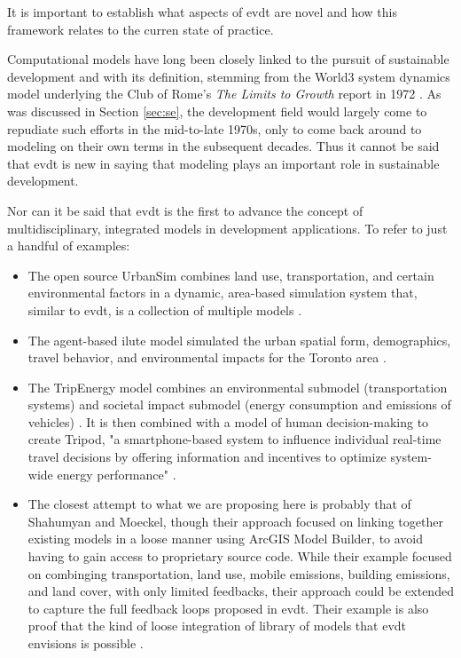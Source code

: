 \documentclass[notitlepage]{article}
\begin{document}
It is important to establish what aspects of \ac{evdt} are novel and how this framework relates to the curren state of practice. 

Computational models have long been closely linked to the pursuit of sustainable development and with its definition, stemming from the World3 system dynamics model underlying the Club of Rome's \textit{The Limits to Growth} report in 1972 \cite{meadowsLimitsGrowth1972}. As was discussed in Section \ref{sec:se}, the development field would largely come to repudiate such efforts in the mid-to-late 1970s, only to come back around to modeling on their own terms in the subsequent decades. Thus it cannot be said that \ac{evdt} is new in saying that modeling plays an important role in sustainable development. 

Nor can it be said that \ac{evdt} is the first to advance the concept of multidisciplinary, integrated models in development applications. To refer to just a handful of examples:

\begin{itemize} \setlength{\itemsep}{0pt} \setlength{\parskip}{0pt}
	\item{The open source UrbanSim combines land use, transportation, and certain environmental factors in a dynamic, area-based simulation system that, similar to \ac{evdt}, is a collection of multiple models \cite{waddellUrbanSimModelingUrban2002}.}
	\item{The agent-based \ac{ilute} model simulated the urban spatial form, demographics, travel behavior, and environmental impacts for the Toronto area \cite{millerHistoricalValidationIntegrated2011}.}
	\item{The TripEnergy model combines an environmental submodel (transportation systems) and societal impact submodel (energy consumption and emissions of vehicles) \cite{needellEfficientlySimulatingPersonal2018}. It is then combined with a model of human decision-making to create Tripod, "a smartphone-based system to influence individual real-time travel decisions by offering information and incentives to optimize system-wide energy performance" \cite{azevedoTripodSustainableTravel2018}.}
	\item{The closest attempt to what we are proposing here is probably that of Shahumyan and Moeckel, though their approach focused on linking together existing models in a loose manner using ArcGIS Model Builder, to avoid having to gain access to proprietary source code. While their example focused on combinging transportation, land use, mobile emissions, building emissions, and land cover, with only limited feedbacks, their approach could be extended to capture the full feedback loops proposed in \ac{evdt}. Their example is also proof that the kind of loose integration of library of models that \ac{evdt} envisions is possible \cite{shahumyanIntegrationLandUse2017}.}
\end{itemize} 
\end{document}
